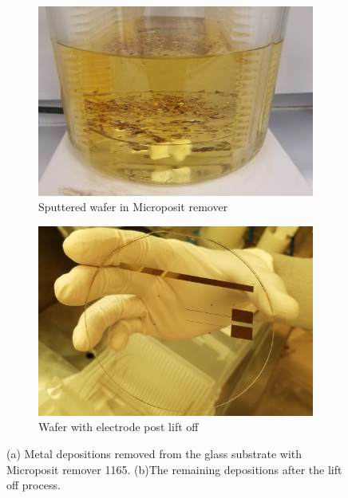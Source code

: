 \begin{figure}
    \centering
    \begin{subfigure}[b]{0.45\textwidth}
        \includegraphics[width=\textwidth]{images/lift_off.jpg}
        \caption{Sputtered wafer in Microposit remover}
        \label{fig:lift_solution}
    \end{subfigure}
    \hfill
    \begin{subfigure}[b]{0.45\textwidth}
        \centering
        \includegraphics[width=\textwidth]{images/electrodes.jpg}
        \caption{Wafer with electrode post lift off}
        \label{fig:electrode_methods}
    \end{subfigure} 
    \caption[Lift off]{(a) Metal depositions removed from the glass substrate with Microposit remover 1165. (b)The remaining depositions after the lift off process.}
    \label{fig:electrode_methods}
\end{figure}

